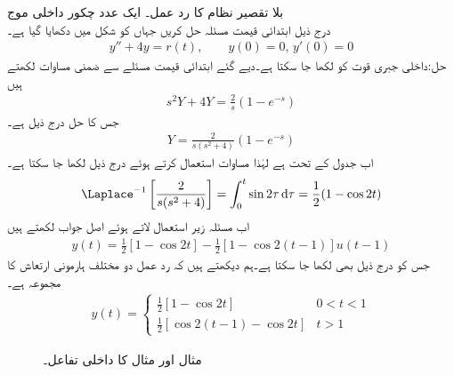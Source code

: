 \quad بلا تقصیر نظام کا رد عمل۔ ایک عدد چکور داخلی موج\\
درج ذیل ابتدائی قیمت مسئلہ حل کریں جہاں  کو شکل  میں دکھایا گیا ہے۔
\begin{align*}
y''+4y=r(t),\quad \quad y(0)=0, \, y'(0)=0
\end{align*}
حل:داخلی جبری قوت کو  لکھا جا سکتا ہے۔دیے گئے ابتدائی قیمت مسئلے  سے ضمنی مساوات لکھتے ہیں
\begin{align*}
s^2Y+4Y=\frac{2}{s}(1-e^{-s})
\end{align*} 
جس کا حل درج ذیل ہے۔
\begin{align*}
Y=\frac{2}{s(s^2+4)}(1-e^{-s})
\end{align*}
اب جدول  کے تحت  ہے  لہٰذا مساوات  استعمال کرتے ہوئے درج ذیل لکھا جا سکتا ہے۔
\begin{align*}
\Laplace^{-1}\left[\frac{2}{s(s^2+4)}\right]=\int_{0}^{t}\sin 2\tau \dif \tau=\frac{1}{2}(1-\cos 2t)
\end{align*}
اب مسئلہ  زیر استعمال لاتے ہوئے اصل جواب لکھتے ہیں
\begin{align*}
y(t)=\frac{1}{2}[1-\cos 2t]-\frac{1}{2}[1-\cos 2(t-1)]u(t-1)
\end{align*}
جس کو درج ذیل بھی لکھا جا سکتا ہے۔ہم دیکھتے ہیں کہ رد عمل دو مختلف ہارمونی ارتعاش کا مجموعہ ہے۔
\begin{align*}
y(t)=
\begin{cases}
\frac{1}{2}[1-\cos 2t] & 0<t<1\\[0.5ex]
\frac{1}{2}[\cos 2(t-1)-\cos 2t]& t>1
\end{cases}
\end{align*}
%
\begin{figure}
\centering
{}
\caption{مثال  اور مثال  کا داخلی تفاعل۔}
\label{شکل_مثال_لاپلاس_تقصیر_اکائی}
\end{figure}
